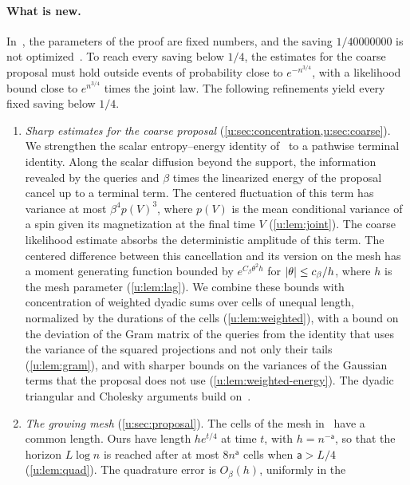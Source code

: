 \paragraph{What is new.}
In~\cite{oai-typical-upper}, the parameters of the proof are fixed numbers,
and the saving $1/40000000$ is not optimized~\cite[Section~1, after
Theorem~1]{oai-typical-upper}. To reach every saving below $1/4$, the
estimates for the coarse proposal must hold outside events of probability
close to $e^{-n^{3/4}}$, with a likelihood bound close to $e^{n^{3/4}}$ times
the joint law. The following refinements yield every fixed saving below $1/4$.
\begin{enumerate}
\item \emph{Sharp estimates for the coarse proposal}
(\cref{u:sec:concentration,u:sec:coarse}). We strengthen the scalar
entropy--energy identity of~\cite[Section~3, Lemma~4]{oai-typical-upper}
to a pathwise terminal identity. Along the scalar diffusion beyond the
support, the information revealed by the queries and $\beta$ times the
linearized energy of the proposal cancel up to a terminal term. The centered fluctuation
of this term has variance at most $\beta^4p(V)^3$, where $p(V)$ is the mean
conditional variance of a spin given its magnetization at the final time $V$
(\cref{u:lem:joint}). The coarse likelihood estimate absorbs the
deterministic amplitude of this term. The centered difference between this cancellation
and its version on the mesh has a moment generating function bounded by
$e^{C_\beta\theta^2h}$ for $\lvert \theta\rvert\le c_\beta/h$, where $h$ is the mesh
parameter (\cref{u:lem:lag}). We combine these bounds with concentration of
weighted dyadic sums over cells of unequal length, normalized by the
durations of the cells (\cref{u:lem:weighted}), with a bound on the deviation
of the Gram matrix of the queries from the identity that uses the variance of
the squared projections and not only their tails (\cref{u:lem:gram}), and
with sharper bounds on the variances of the Gaussian terms that the proposal
does not use (\cref{u:lem:weighted-energy}). The dyadic triangular and
Cholesky arguments build on~\cite[Section~4, proof of
Proposition~5]{oai-typical-upper}.
\item \emph{The growing mesh} (\cref{u:sec:proposal}). The cells of the mesh
in~\cite{oai-typical-upper} have a common length. Ours have length $he^{t/4}$
at time $t$, with $h=n^{-\mathsf a}$, so that the horizon $L\log n$ is
reached after at most $8n^{\mathsf a}$ cells when $\mathsf a>L/4$
(\cref{u:lem:quad}). The quadrature error is $O_\beta(h)$, uniformly in the

\end{enumerate}
